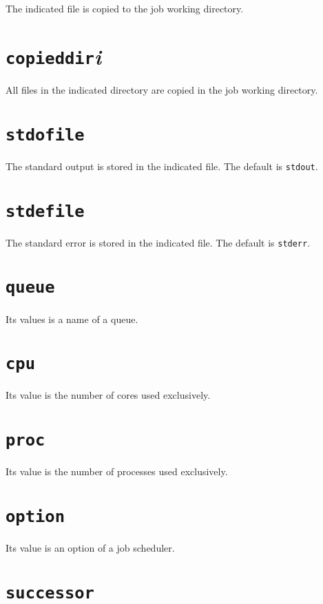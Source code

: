 \documentclass[a4paper,10pt]{report}
\begin{document}
The indicated file is copied to the job working directory.

\section{\texttt{copieddir}\textit{i}}

All files in the indicated directory are copied
in the job working directory.

\section{\texttt{stdofile}}

The standard output is stored in the indicated file.
The default is \texttt{stdout}.

\section{\texttt{stdefile}}

The standard error is stored in the indicated file.
The default is \texttt{stderr}.

\section{\texttt{queue}}

Its values is a name of a queue.

\section{\texttt{cpu}}

Its value is the number of cores used exclusively.

\section{\texttt{proc}}

Its value is the number of processes used exclusively.

\section{\texttt{option}}

Its value is an option of a job scheduler.

\section{\texttt{successor}}
\end{document}
